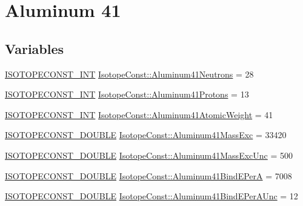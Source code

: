 \hypertarget{group___isotope_const-_aluminum-_al41}{}\section{Aluminum 41}
\label{group___isotope_const-_aluminum-_al41}
\subsection*{Variables}
\begin{DoxyCompactItemize}
\item 
\mbox{\hyperlink{group___isotope_const-_macros_ga5f18360b3e99483a35c32d789e62621c}{I\+S\+O\+T\+O\+P\+E\+C\+O\+N\+S\+T\+\_\+\+I\+NT}} \mbox{\hyperlink{group___isotope_const-_aluminum-_al41_ga41e59708e473244558deaa37a7d57038}{Isotope\+Const\+::\+Aluminum41\+Neutrons}} = 28
\item 
\mbox{\hyperlink{group___isotope_const-_macros_ga5f18360b3e99483a35c32d789e62621c}{I\+S\+O\+T\+O\+P\+E\+C\+O\+N\+S\+T\+\_\+\+I\+NT}} \mbox{\hyperlink{group___isotope_const-_aluminum-_al41_gae8ed09d432dc0bbf75c223cebedbd19c}{Isotope\+Const\+::\+Aluminum41\+Protons}} = 13
\item 
\mbox{\hyperlink{group___isotope_const-_macros_ga5f18360b3e99483a35c32d789e62621c}{I\+S\+O\+T\+O\+P\+E\+C\+O\+N\+S\+T\+\_\+\+I\+NT}} \mbox{\hyperlink{group___isotope_const-_aluminum-_al41_gaf8adfcba072d54219dfeebb40f138f4c}{Isotope\+Const\+::\+Aluminum41\+Atomic\+Weight}} = 41
\item 
\mbox{\hyperlink{group___isotope_const-_macros_ga8f45a7272ce02c0b4c65c44636ed719a}{I\+S\+O\+T\+O\+P\+E\+C\+O\+N\+S\+T\+\_\+\+D\+O\+U\+B\+LE}} \mbox{\hyperlink{group___isotope_const-_aluminum-_al41_ga6c3f99fed0672274d19dc940fe85ad2f}{Isotope\+Const\+::\+Aluminum41\+Mass\+Exc}} = 33420
\item 
\mbox{\hyperlink{group___isotope_const-_macros_ga8f45a7272ce02c0b4c65c44636ed719a}{I\+S\+O\+T\+O\+P\+E\+C\+O\+N\+S\+T\+\_\+\+D\+O\+U\+B\+LE}} \mbox{\hyperlink{group___isotope_const-_aluminum-_al41_gaf2ec6a521faf350be0e7854507db1dcb}{Isotope\+Const\+::\+Aluminum41\+Mass\+Exc\+Unc}} = 500
\item 
\mbox{\hyperlink{group___isotope_const-_macros_ga8f45a7272ce02c0b4c65c44636ed719a}{I\+S\+O\+T\+O\+P\+E\+C\+O\+N\+S\+T\+\_\+\+D\+O\+U\+B\+LE}} \mbox{\hyperlink{group___isotope_const-_aluminum-_al41_gabd383fa08352354ea455ef47c6a812a8}{Isotope\+Const\+::\+Aluminum41\+Bind\+E\+PerA}} = 7008
\item 
\mbox{\hyperlink{group___isotope_const-_macros_ga8f45a7272ce02c0b4c65c44636ed719a}{I\+S\+O\+T\+O\+P\+E\+C\+O\+N\+S\+T\+\_\+\+D\+O\+U\+B\+LE}} \mbox{\hyperlink{group___isotope_const-_aluminum-_al41_ga2747dfe614b1a99fd63059e5569d38dc}{Isotope\+Const\+::\+Aluminum41\+Bind\+E\+Per\+A\+Unc}} = 12

\end{DoxyCompactItemize}
